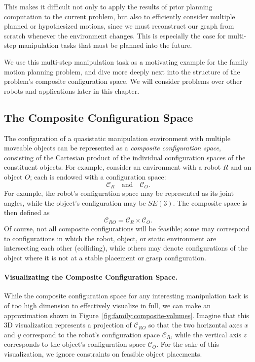 This makes it difficult not only to apply the results of prior
planning computation to the current problem,
but also to efficiently consider multiple planned or hypothesized
motions,
since we must reconstruct our graph from scratch whenever
the environment changes.
This is especially the case for
multi-step manipulation tasks that must be planned into the future.

We use this multi-step manipulation task as a motivating example
for the family motion planning problem,
and dive more deeply next into the structure of the problem's
composite configuration space.
We will consider problems over other robots and applications
later in this chapter.

\subsection{The Composite Configuration Space}

The configuration of a quasistatic manipulation environment
with multiple moveable objects can be represented as a
\emph{composite configuration space},
consisting of the Cartesian product of the individual configuration
spaces of the constituent objects.
For example,
consider an environment with a robot $R$ and an object $O$;
each is endowed with a configuration space:
\begin{equation}
   \mathcal{C}_R \quad\mbox{and}\quad \mathcal{C}_O.
\end{equation}
For example,
the robot's configuration space may be represented as its joint angles,
while the object's configuration may be $SE(3)$.
The composite space is then defined as
\begin{equation}
   \mathcal{C}_{RO} = \mathcal{C}_R \times \mathcal{C}_O.
\end{equation}
Of course,
not all composite configurations will be feasible;
some may correspond to configurations in which the robot,
object, or static environment are intersecting each other (colliding),
while others may denote configurations of the object where it is
not at a stable placement or grasp configuration.

\paragraph{Visualizating the Composite Configuration Space.}
While the composite configuration space for any interesting
manipulation task
is of too high dimension to effectively visualize in full,
we can make an approximation shown
in Figure~\ref{fig:family:composite-volumes}.
Imagine that this 3D visualization represents a projection of
$\mathcal{C}_{RO}$
so that the two horizontal axes $x$ and $y$ correspond to
the robot's configuration space $\mathcal{C}_{R}$,
while the vertical axis $z$ corresponds to the object's
configuration space $\mathcal{C}_{O}$.
For the sake of this visualization,
we ignore constraints on feasible object placements.

